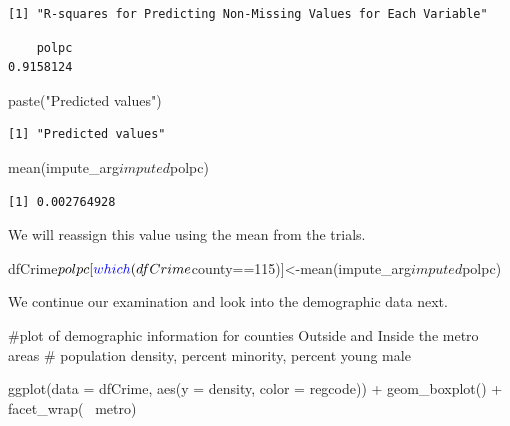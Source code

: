 \documentclass[]{article}
\newenvironment{Shaded}{}{}
\newcommand{\CommentTok}[1]{\textcolor[rgb]{0.00,0.50,0.00}{#1}}
\newcommand{\DataTypeTok}[1]{#1}
\newcommand{\DecValTok}[1]{#1}
\newcommand{\KeywordTok}[1]{\textcolor[rgb]{0.00,0.00,1.00}{#1}}
\newcommand{\NormalTok}[1]{#1}
\newcommand{\OperatorTok}[1]{#1}
\newcommand{\StringTok}[1]{\textcolor[rgb]{0.00,0.50,0.50}{#1}}
\begin{document}
\begin{verbatim}
[1] "R-squares for Predicting Non-Missing Values for Each Variable"
\end{verbatim}

\begin{Shaded}
\end{Shaded}

\begin{verbatim}
    polpc 
0.9158124 
\end{verbatim}

\begin{Shaded}
\begin{Highlighting}[]
\KeywordTok{paste}\NormalTok{(}\StringTok{"Predicted values"}\NormalTok{)}
\end{Highlighting}
\end{Shaded}

\begin{verbatim}
[1] "Predicted values"
\end{verbatim}

\begin{Shaded}
\begin{Highlighting}[]
\KeywordTok{mean}\NormalTok{(impute_arg}\OperatorTok{$}\NormalTok{imputed}\OperatorTok{$}\NormalTok{polpc)}
\end{Highlighting}
\end{Shaded}

\begin{verbatim}
[1] 0.002764928
\end{verbatim}

We will reassign this value using the mean from the trials.

\begin{Shaded}
\begin{Highlighting}[]
\NormalTok{dfCrime}\OperatorTok{$}\NormalTok{polpc[}\KeywordTok{which}\NormalTok{(dfCrime}\OperatorTok{$}\NormalTok{county}\OperatorTok{==}\DecValTok{115}\NormalTok{)]<-}\KeywordTok{mean}\NormalTok{(impute_arg}\OperatorTok{$}\NormalTok{imputed}\OperatorTok{$}\NormalTok{polpc)}
\end{Highlighting}
\end{Shaded}

We continue our examination and look into the demographic data next.

\begin{Shaded}
\begin{Highlighting}[]
\CommentTok{#plot of demographic information for counties Outside and Inside the metro areas}
\CommentTok{# population density, percent minority, percent young male}

\KeywordTok{ggplot}\NormalTok{(}\DataTypeTok{data =}\NormalTok{ dfCrime, }\KeywordTok{aes}\NormalTok{(}\DataTypeTok{y =}\NormalTok{ density, }\DataTypeTok{color =}\NormalTok{ regcode)) }\OperatorTok{+}
\StringTok{      }\KeywordTok{geom_boxplot}\NormalTok{() }\OperatorTok{+}\StringTok{ }\KeywordTok{facet_wrap}\NormalTok{(}\OperatorTok{~}\StringTok{ }\NormalTok{metro)}
\end{Highlighting}
\end{Shaded}
\end{document}
